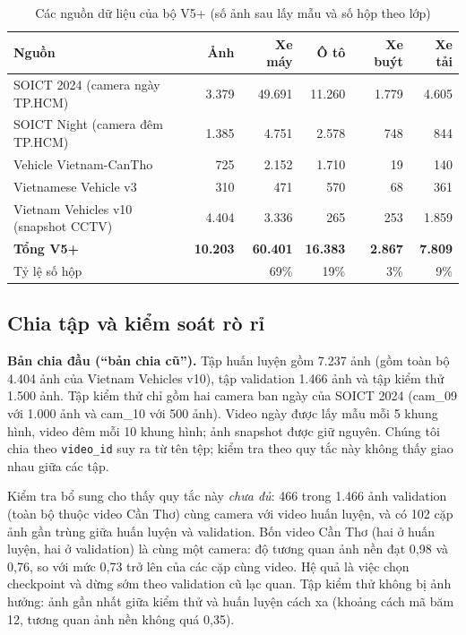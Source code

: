 \documentclass[10pt,journal,letterpaper]{IEEEtran}
\begin{document}
\begin{table}[!t]
\caption{Các nguồn dữ liệu của bộ V5+ (số ảnh sau lấy mẫu và số hộp theo lớp)}
\label{tab:src}
\centering
\footnotesize
\begin{tabular}{lrrrrr}
\toprule
Nguồn & Ảnh & Xe máy & Ô tô & Xe buýt & Xe tải \\
\midrule
SOICT 2024 (camera ngày TP.HCM) & 3.379 & 49.691 & 11.260 & 1.779 & 4.605 \\
SOICT Night (camera đêm TP.HCM) & 1.385 & 4.751 & 2.578 & 748 & 844 \\
Vehicle Vietnam-CanTho & 725 & 2.152 & 1.710 & 19 & 140 \\
Vietnamese Vehicle v3 & 310 & 471 & 570 & 68 & 361 \\
Vietnam Vehicles v10 (snapshot CCTV) & 4.404 & 3.336 & 265 & 253 & 1.859 \\
\midrule
\textbf{Tổng V5+} & \textbf{10.203} & \textbf{60.401} & \textbf{16.383} & \textbf{2.867} & \textbf{7.809} \\
Tỷ lệ số hộp & & 69\% & 19\% & 3\% & 9\% \\
\bottomrule
\end{tabular}
\end{table}

\subsection{Chia tập và kiểm soát rò rỉ}
\textbf{Bản chia đầu (``bản chia cũ'').} Tập huấn luyện gồm 7.237 ảnh (gồm toàn bộ 4.404 ảnh của Vietnam Vehicles v10), tập validation 1.466 ảnh và tập kiểm thử 1.500 ảnh. Tập kiểm thử chỉ gồm hai camera ban ngày của SOICT 2024 (cam\_09 với 1.000 ảnh và cam\_10 với 500 ảnh). Video ngày được lấy mẫu mỗi 5 khung hình, video đêm mỗi 10 khung hình; ảnh snapshot được giữ nguyên. Chúng tôi chia theo \texttt{video\_id} suy ra từ tên tệp; kiểm tra theo quy tắc này không thấy giao nhau giữa các tập.

Kiểm tra bổ sung cho thấy quy tắc này \emph{chưa đủ}: 466 trong 1.466 ảnh validation (toàn bộ thuộc video Cần Thơ) cùng camera với video huấn luyện, và có 102 cặp ảnh gần trùng giữa huấn luyện và validation. Bốn video Cần Thơ (hai ở huấn luyện, hai ở validation) là cùng một camera: độ tương quan ảnh nền đạt 0,98 và 0,76, so với mức 0,73 trở lên của các cặp cùng video. Hệ quả là việc chọn checkpoint và dừng sớm theo validation cũ lạc quan. Tập kiểm thử không bị ảnh hưởng: ảnh gần nhất giữa kiểm thử và huấn luyện cách xa (khoảng cách mã băm 12, tương quan ảnh nền không quá 0,35).
\end{document}
